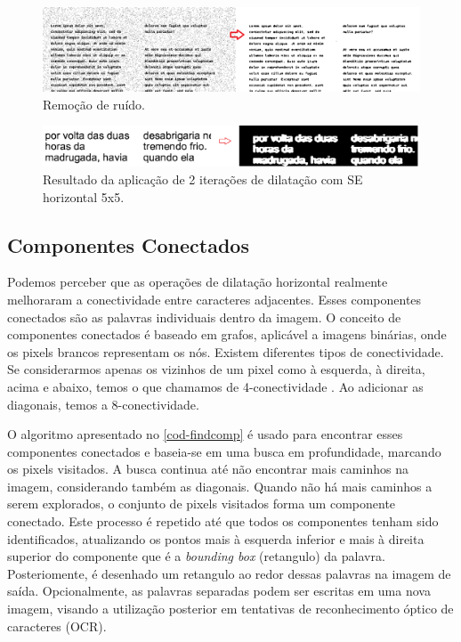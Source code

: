 \documentclass[english, 
               brazil, 
               bsc] %
               {dcomp-abntex2}
\begin{document}
\begin{figure}[htb]
        \caption{\label{ruidos} \small  Remoção de ruído. }
        \begin{center}
            \includegraphics[scale=0.55]{./images/noise.png}
        \end{center}
\end{figure}


\begin{figure}[htb]
        \caption{\label{horz} \small Resultado da aplicação de 2 iterações de dilatação com SE horizontal 5x5. }
        \begin{center}
            \includegraphics[scale=0.15]{./images/horizontal_5x5_aplicacao.png}
        \end{center}
\end{figure}



\subsection{Componentes Conectados}

Podemos perceber que as operações de dilatação horizontal realmente melhoraram a conectividade entre caracteres adjacentes. Esses componentes conectados são as palavras individuais dentro da imagem. O conceito de componentes conectados é baseado em grafos, aplicável a imagens binárias, onde os pixels brancos representam os nós. Existem diferentes tipos de conectividade. Se considerarmos apenas os vizinhos de um pixel como à esquerda, à direita, acima e abaixo, temos o que chamamos de 4-conectividade \cite[2.5.2 Adjacency, Connectivity, Regions, and Boundaries]{gonzalez2008digital}. Ao adicionar as diagonais, temos a 8-conectividade.

O algoritmo apresentado no \autoref{cod-findcomp} é usado para encontrar esses componentes conectados e baseia-se em uma busca em profundidade, marcando os pixels visitados. A busca continua até não encontrar mais caminhos na imagem, considerando também as diagonais. Quando não há mais caminhos a serem explorados, o conjunto de pixels visitados forma um componente conectado. Este processo é repetido até que todos os componentes tenham sido identificados, atualizando os pontos mais à esquerda inferior e mais à direita superior do componente que é a \textit{bounding box} (retangulo) da palavra. Posteriomente, é desenhado um retangulo ao redor dessas palavras na imagem de saída. Opcionalmente, as palavras separadas podem ser escritas em uma nova imagem, visando a utilização posterior em tentativas de reconhecimento óptico de caracteres (OCR). 
\end{document}
